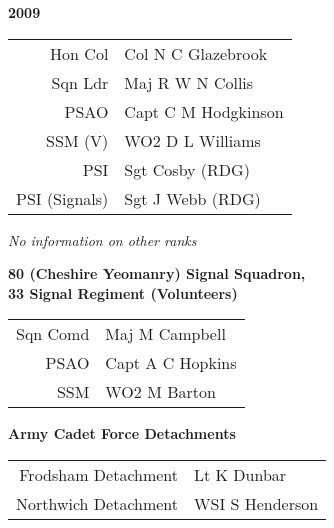 \begin{center}
  \Huge
  \textbf{2009}
\end{center}

\begin{center}
  \small
  \begin{tabular}{rl}
    Hon Col & Col N C Glazebrook \\
    Sqn Ldr & Maj R W N Collis \\
    PSAO & Capt C M Hodgkinson \\
    SSM (V) & WO2 D L Williams \\
    PSI & Sgt Cosby (RDG) \\
    PSI (Signals) & Sgt J Webb (RDG) \\
  \end{tabular}
\end{center}

\begin{center}
  \textit{No information on other ranks}
\end{center}

\begin{center}
  \Large
  \textbf{80 (Cheshire Yeomanry) Signal Squadron, \\ 33 Signal Regiment (Volunteers)}
\end{center}

\begin{center}
  \small
  \begin{tabular}{rl}
    Sqn Comd & Maj M Campbell \\
    PSAO & Capt A C Hopkins \\
    SSM & WO2 M Barton \\
  \end{tabular}
\end{center}

\begin{center}
  \Large
  \textbf{Army Cadet Force Detachments}
\end{center}

\begin{center}
  \small
  \begin{tabular}{rl}
    Frodsham Detachment & Lt K Dunbar \\
    Northwich Detachment & WSI S Henderson \\
  \end{tabular}
\end{center}

\vspace{50mm}

\pagebreak
